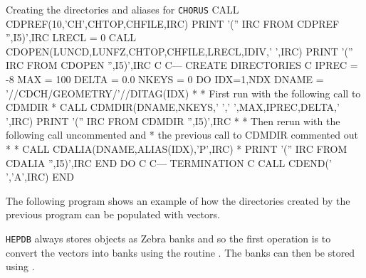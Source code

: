 \begin{XMPt}{Creating the directories and aliases for {\tt CHORUS}}
      CALL CDPREF(10,'CH',CHTOP,CHFILE,IRC)
      PRINT '('' IRC FROM CDPREF '',I5)',IRC
      LRECL = 0
      CALL CDOPEN(LUNCD,LUNFZ,CHTOP,CHFILE,LRECL,IDIV,' ',IRC)
      PRINT '('' IRC FROM CDOPEN '',I5)',IRC
C
C--- CREATE DIRECTORIES
C
      IPREC = -8
      MAX   = 100
      DELTA = 0.0
      NKEYS = 0
      DO IDX=1,NDX
      DNAME = '//CDCH/GEOMETRY/'//DITAG(IDX)
*
*     First run with the following call to CDMDIR
*
      CALL CDMDIR(DNAME,NKEYS,' ',' ',MAX,IPREC,DELTA,' ',IRC)
      PRINT '('' IRC FROM CDMDIR '',I5)',IRC
*
*     Then rerun with the following call uncommented and
*     the previous call to CDMDIR commented out
*
*     CALL CDALIA(DNAME,ALIAS(IDX),'P',IRC)
*     PRINT '('' IRC FROM CDALIA '',I5)',IRC
      END DO
C
C--- TERMINATION
C
      CALL CDEND(' ','A',IRC)
      END
\end{XMPt}

The following program shows an example of how the directories
created by the previous program can be populated with vectors.

{\tt HEPDB} always stores objects as Zebra banks and so the
first operation is to convert the vectors into banks using
the routine . The banks can then be stored
using .

